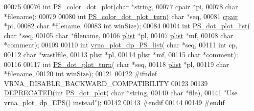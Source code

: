 \begin{DoxyCode}
00075 
00076 \textcolor{keywordtype}{int} \mbox{\hyperlink{group__plotting__utils_ga2f6294599b0fbe8338bec6918c3b1ba7}{PS\_color\_dot\_plot}}(\textcolor{keywordtype}{char} *\textcolor{keywordtype}{string},
00077                       \mbox{\hyperlink{group__data__structures_structvrna__cpair__s}{cpair}} *pi,
00078                       \textcolor{keywordtype}{char} *filename);
00079 
00080 \textcolor{keywordtype}{int} \mbox{\hyperlink{group__plotting__utils_gab3e6bb8fac08c07b32883ae2049aed9d}{PS\_color\_dot\_plot\_turn}}( \textcolor{keywordtype}{char} *seq,
00081                             \mbox{\hyperlink{group__data__structures_structvrna__cpair__s}{cpair}} *pi,
00082                             \textcolor{keywordtype}{char} *filename,
00083                             \textcolor{keywordtype}{int} winSize);
00084 
00104 \textcolor{keywordtype}{int} \mbox{\hyperlink{group__plotting__utils_ga00ea223b5cf02eb2faae5ff29f0d5e12}{PS\_dot\_plot\_list}}( \textcolor{keywordtype}{char} *seq,
00105                       \textcolor{keywordtype}{char} *filename,
00106                       \mbox{\hyperlink{group__struct__utils_structvrna__elem__prob__s}{plist}} *pl,
00107                       \mbox{\hyperlink{group__struct__utils_structvrna__elem__prob__s}{plist}} *mf,
00108                       \textcolor{keywordtype}{char} *comment);
00109 
00110 \textcolor{keywordtype}{int} \mbox{\hyperlink{group__plotting__utils_ga3921213b67eb931daeb24451e989f8de}{vrna\_plot\_dp\_PS\_list}}( \textcolor{keywordtype}{char} *seq,
00111                           \textcolor{keywordtype}{int} cp,
00112                           \textcolor{keywordtype}{char} *wastlfile,
00113                           \mbox{\hyperlink{group__struct__utils_structvrna__elem__prob__s}{plist}} *pl,
00114                           \mbox{\hyperlink{group__struct__utils_structvrna__elem__prob__s}{plist}} *mf,
00115                           \textcolor{keywordtype}{char} *comment);
00116 
00117 \textcolor{keywordtype}{int} \mbox{\hyperlink{group__plotting__utils_ga5582a502d39ec3bc8d5ba3262102991c}{PS\_dot\_plot\_turn}}( \textcolor{keywordtype}{char} *seq,
00118                       \mbox{\hyperlink{group__struct__utils_structvrna__elem__prob__s}{plist}} *pl,
00119                       \textcolor{keywordtype}{char} *filename,
00120                       \textcolor{keywordtype}{int} winSize);
00121 
00122 \textcolor{preprocessor}{#ifndef VRNA\_DISABLE\_BACKWARD\_COMPATIBILITY}
00123 
00139 \mbox{\hyperlink{_p_s__dot_8h_aab347a3c03fbe8e7319551b9fa0cce4a}{DEPRECATED}}(\textcolor{keywordtype}{int} \mbox{\hyperlink{group__plotting__utils_ga689a97a7e3b8a2df14728b8204d9d57b}{PS\_dot\_plot}}( \textcolor{keywordtype}{char} *\textcolor{keywordtype}{string},
00140                             \textcolor{keywordtype}{char} *file),
00141 \textcolor{stringliteral}{"Use vrna\_plot\_dp\_EPS() instead"});
00142 
00143 \textcolor{preprocessor}{#endif}
00144 
00149 \textcolor{preprocessor}{#endif}
\end{DoxyCode}
